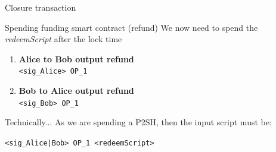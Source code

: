 \documentclass{beamer}
\begin{document}
\begin{frame}{Closure transaction}
 \begin{exampleblock}{Spending funding smart contract (refund)}
  We now need to spend the \textit{redeemScript} after the lock time
  \pause
  \begin{center}
   \begin{enumerate}[<+->]
    \item \textbf{Alice to Bob output refund}\\
          \texttt{<sig\_Alice> OP\_1}
    \item \textbf{Bob to Alice output refund}\\
          \texttt{<sig\_Bob> OP\_1}
   \end{enumerate}
  \end{center}
 \end{exampleblock}
 \pause
 \begin{exampleblock}{Technically...}
  As we are spending a P2SH, then the input script must be:\
  \begin{center}
   \texttt{<sig\_Alice|Bob> OP\_1 <redeemScript>}
  \end{center}

 \end{exampleblock}
\end{frame}
\end{document}
